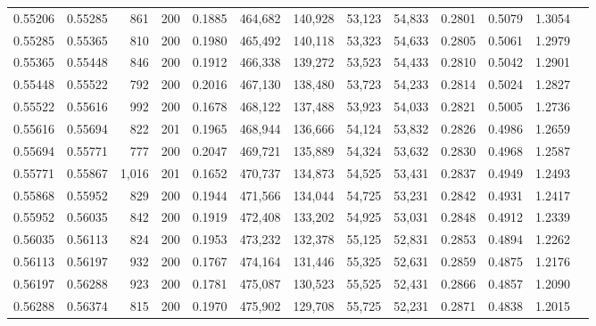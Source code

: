 \begin{tabular}{rrrrrrrrrrrrr}
0.55206 & 0.55285 &   861 & 200 &                                     0.1885 & 464,682 & 140,928 &  53,123 &  54,833 & 0.2801 & 0.5079 & 1.3054 \\
0.55285 & 0.55365 &   810 & 200 &                                     0.1980 & 465,492 & 140,118 &  53,323 &  54,633 & 0.2805 & 0.5061 & 1.2979 \\
0.55365 & 0.55448 &   846 & 200 &                                     0.1912 & 466,338 & 139,272 &  53,523 &  54,433 & 0.2810 & 0.5042 & 1.2901 \\
0.55448 & 0.55522 &   792 & 200 &                                     0.2016 & 467,130 & 138,480 &  53,723 &  54,233 & 0.2814 & 0.5024 & 1.2827 \\
0.55522 & 0.55616 &   992 & 200 &                                     0.1678 & 468,122 & 137,488 &  53,923 &  54,033 & 0.2821 & 0.5005 & 1.2736 \\
0.55616 & 0.55694 &   822 & 201 &                                     0.1965 & 468,944 & 136,666 &  54,124 &  53,832 & 0.2826 & 0.4986 & 1.2659 \\
0.55694 & 0.55771 &   777 & 200 &                                     0.2047 & 469,721 & 135,889 &  54,324 &  53,632 & 0.2830 & 0.4968 & 1.2587 \\
0.55771 & 0.55867 & 1,016 & 201 &                                     0.1652 & 470,737 & 134,873 &  54,525 &  53,431 & 0.2837 & 0.4949 & 1.2493 \\
0.55868 & 0.55952 &   829 & 200 &                                     0.1944 & 471,566 & 134,044 &  54,725 &  53,231 & 0.2842 & 0.4931 & 1.2417 \\
0.55952 & 0.56035 &   842 & 200 &                                     0.1919 & 472,408 & 133,202 &  54,925 &  53,031 & 0.2848 & 0.4912 & 1.2339 \\
0.56035 & 0.56113 &   824 & 200 &                                     0.1953 & 473,232 & 132,378 &  55,125 &  52,831 & 0.2853 & 0.4894 & 1.2262 \\
0.56113 & 0.56197 &   932 & 200 &                                     0.1767 & 474,164 & 131,446 &  55,325 &  52,631 & 0.2859 & 0.4875 & 1.2176 \\
0.56197 & 0.56288 &   923 & 200 &                                     0.1781 & 475,087 & 130,523 &  55,525 &  52,431 & 0.2866 & 0.4857 & 1.2090 \\
0.56288 & 0.56374 &   815 & 200 &                                     0.1970 & 475,902 & 129,708 &  55,725 &  52,231 & 0.2871 & 0.4838 & 1.2015 \\

\end{tabular}
